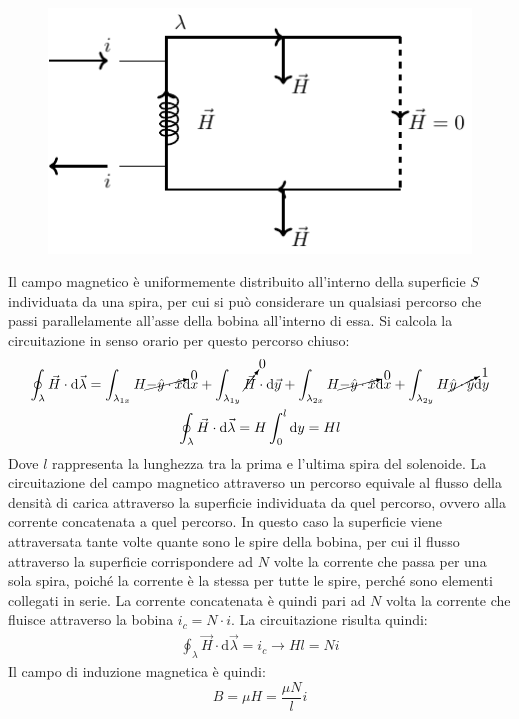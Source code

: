 \documentclass{article}
\newcommand{\df}{\mathrm{d}}
\numberwithin{equation}{subsection}
\begin{document}
\begin{figure}[H]%
    \centering
    \includegraphics{induttore-fisico.pdf}
    \label{fig:induttore-fisico}
\end{figure}

Il campo magnetico è uniformemente distribuito all'interno della superficie $S$ individuata da una spira, per cui si può considerare un qualsiasi percorso che passi parallelamente 
all'asse della bobina all'interno di essa. Si calcola la circuitazione in senso orario per questo percorso chiuso:
\begin{gather*}
    \displaystyle\oint_{\lambda}\vec{H}\cdot \df\vec{\lambda}=\int_{\lambda_{1x}}H\cancelto{0}{-\hat{y}\cdot\hat{x}}\df  x+\int_{\lambda_{1y}}\cancelto{0}{\vec{H}}\cdot \df\vec{y}+\int_{\lambda_{2x}}H\cancelto{0}{-\hat{y}\cdot\hat{x}}\df  x+\int_{\lambda_{2y}}H\cancelto{1}{\hat{y}\cdot\hat{y}}\df  y\\
    \displaystyle\oint_{\lambda}\vec{H}\cdot \df\vec{\lambda}=H\int_0^l\df y=Hl
\end{gather*}
Dove $l$ rappresenta la lunghezza tra la prima e l'ultima spira del solenoide. La circuitazione del campo magnetico attraverso un percorso equivale al 
flusso della densità di carica attraverso la superficie individuata da quel percorso, ovvero alla corrente concatenata a quel percorso. In questo caso la superficie 
viene attraversata tante volte quante sono le spire della bobina, per cui il flusso attraverso la superficie corrispondere ad $N$ volte la corrente che passa per una sola spira, 
poiché la corrente è la stessa per tutte le spire, perché sono elementi collegati in serie. La corrente concatenata è quindi pari ad $N$ volta la corrente che fluisce 
attraverso la bobina $i_c=N\cdot i$. La circuitazione risulta quindi:
\begin{gather*}
    \displaystyle\oint_{\lambda}\vec{H}\cdot \df\vec{\lambda}=i_c\to Hl=Ni
\end{gather*}
Il campo di induzione magnetica è quindi:
\begin{equation*}
    B=\mu H=\displaystyle\frac{\mu N}{l}i
\end{equation*}
\end{document}
